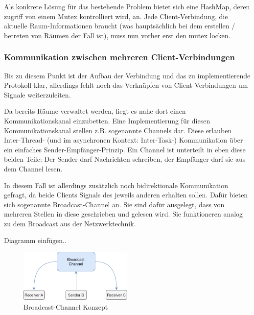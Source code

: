 \documentclass{IEEEtran}
\begin{document}
\begin{twocolumn}
Als konkrete Lösung für das bestehende Problem bietet sich eine HashMap, deren
zugriff von einem Mutex kontrolliert wird, an. Jede Client-Verbindung, die
aktuelle Raum-Informationen braucht (was hauptsächlich bei dem erstellen /
betreten von Räumen der Fall ist), muss nun vorher erst den mutex locken. 

\subsubsection{Kommunikation zwischen mehreren Client-Verbindungen}

Bis zu diesem Punkt ist der Aufbau der Verbindung und das zu implementierende
Protokoll klar, allerdings fehlt noch das Verknüpfen von Client-Verbindungen um
Signale weiterzuleiten.

Da bereits Räume verwaltet werden, liegt es nahe dort einen Kommunikationskanal
einzubetten. Eine Implementierung für diesen Kommunikationskanal stellen z.B.
sogenannte Channels dar. Diese erlauben Inter-Thread- (und im asynchronen
Kontext: Inter-Task-) Kommunikation über ein einfaches
Sender-Empfänger-Prinzip. Ein Channel ist unterteilt in eben diese beiden
Teile: Der Sender darf Nachrichten schreiben, der Empfänger darf sie aus dem
Channel lesen.

In diesem Fall ist allerdings zusätzlich noch bidirektionale Kommunikation
gefragt, da beide Clients Signals des jeweils anderen erhalten sollen. Dafür
bieten sich sogenannte Broadcast-Channel an. Sie sind dafür ausgelegt, dass von
mehreren Stellen in diese geschrieben und gelesen wird. Sie funktioneren analog
zu dem Broadcast aus der Netzwerktechnik.

Diagramm einfügen..




\begin{figure}[ht]
	\includegraphics[width=0.5\textwidth]{diagram-broadcast}
	\centering
	\caption{Broadcast-Channel Konzept}
\end{figure}


\end{twocolumn}
\end{document}
